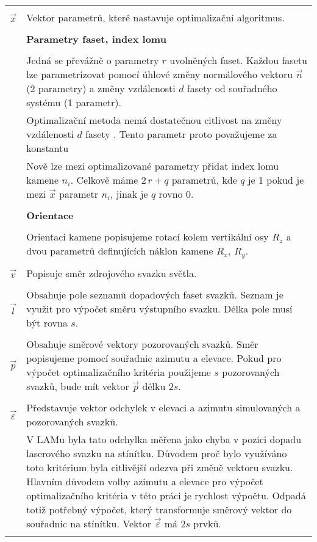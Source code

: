 \begin{tabular}{l p{12cm}}
 & \\
$\vec{x}$ & Vektor parametrů, které nastavuje optimalizační algoritmus.\\ & \\

 &\textbf{Parametry faset, index lomu}\\ & \\

& Jedná se převážně o parametry $r$ uvolněných faset. Každou fasetu lze parametrizovat pomocí úhlové změny normálového vektoru $\vec{n}$ (2 parametry) a změny vzdálenosti $d$ fasety od souřadného systému (1 parametr).\\ 
 
& Optimalizační metoda nemá dostatečnou citlivost na změny vzdálenosti $d$ fasety \cite{Bodlak2005}. Tento parametr proto považujeme za konstantu\\
 
& Nově lze mezi optimalizované parametry přidat index lomu kamene $n_i$. Celkově máme $2\,r + q$ parametrů, kde $q$ je 1 pokud je mezi $\vec{x}$ parametr $n_i$, jinak je $q$ rovno 0.\\ & \\

 &\textbf{Orientace}\\ & \\

& Orientaci kamene popisujeme rotací kolem vertikální osy $R_z$ a dvou parametrů definujících náklon kamene $R_x$, $R_y$. 
 \\ & \\
 
$\vec{v}$ & Popisuje směr zdrojového svazku světla.\\ & \\  

$\vec{l}$ & Obsahuje pole seznamů dopadových faset svazků. Seznam je využit pro výpočet směru výstupního svazku. Délka pole musí být rovna $s$. \\ & \\
 
$\vec{p}$ & Obsahuje směrové vektory pozorovaných svazků. Směr popisujeme pomocí souřadnic azimutu a elevace. Pokud pro výpočet optimalizačního kritéria použijeme $s$ pozorovaných svazků, bude mít vektor $\vec{p}$ délku $2s$. \\ & \\

$\vec{\varepsilon}$ & Představuje vektor odchylek v elevaci a azimutu simulovaných a pozorovaných svazků.\\  
& V LAMu \cite{Bodlak2005} byla tato odchylka měřena jako chyba v pozici dopadu laserového svazku na stínítku. Důvodem proč bylo využíváno toto kritérium byla citlivější odezva při změně vektoru svazku. Hlavním důvodem volby azimutu a elevace pro výpočet optimalizačního kritéria v této práci je rychlost výpočtu. Odpadá totiž potřebný výpočet, který transformuje směrový vektor do souřadnic na stínítku. Vektor $\vec{\varepsilon}$ má $2s$ prvků.\\ & \\

\end{tabular}

